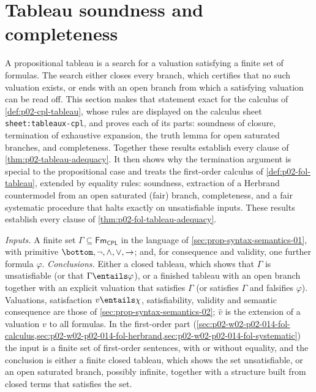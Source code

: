 \section{Tableau soundness and completeness}
\label{sec:p02-w02-p02-014-tableau-metatheory}

A propositional tableau is a search for a valuation satisfying a finite set
of formulas.  The search either closes every branch, which certifies that no
such valuation exists, or ends with an open branch from which a satisfying
valuation can be read off.  This section makes that statement exact for the
calculus of \cref{def:p02-cpl-tableau}, whose rules are displayed on the
calculus sheet \texttt{sheet:\allowbreak tableaux-cpl}, and proves each of its parts: soundness of
closure, termination of exhaustive expansion, the truth lemma for open
saturated branches, and completeness.  Together these results establish every
clause of \cref{thm:p02-tableau-adequacy}.  It then shows why the
termination argument is special to the propositional case and treats the
first-order calculus of \cref{def:p02-fol-tableau}, extended by equality
rules: soundness, extraction of a Herbrand countermodel from an open
saturated (fair) branch, completeness, and a fair systematic procedure that
halts exactly on unsatisfiable inputs.  These results establish every clause
of \cref{thm:p02-fol-tableau-adequacy}.

\emph{Inputs.}  A finite set \(\Gamma\subseteq\mathsf{Fm}_{\mathsf{CPL}}\)
in the language of \cref{sec:prop-syntax-semantics-01}, with primitive
\(\bottom,\neg,\land,\lor,\to\); and, for consequence and validity, one
further formula \(\varphi\).  \emph{Conclusions.}  Either a closed tableau,
which shows that \(\Gamma\) is unsatisfiable (or that \(\Gamma\entails\varphi\)),
or a finished tableau with an open branch together with an explicit valuation
that satisfies \(\Gamma\) (or satisfies \(\Gamma\) and falsifies
\(\varphi\)).  Valuations, satisfaction \(v\entails\chi\), satisfiability,
validity and semantic consequence are those of
\cref{sec:prop-syntax-semantics-02}; \(\widehat v\) is the extension of a
valuation \(v\) to all formulas.  In the first-order part
(\cref{sec:p02-w02-p02-014-fol-calculus,sec:p02-w02-p02-014-fol-herbrand,sec:p02-w02-p02-014-fol-systematic})
the input is a finite set of first-order sentences, with or without
equality, and the conclusion is either a finite closed tableau, which shows
the set unsatisfiable, or an open saturated branch, possibly infinite,
together with a structure built from closed terms that satisfies the set.

